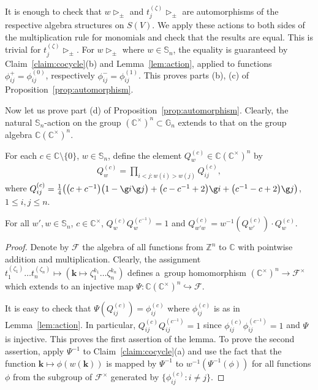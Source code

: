 It is enough to check that $w\mathop{\triangleright}\nolimits_\pm$ and
$t_j^{(\zeta)}\mathop{\triangleright}\nolimits_\pm$ are automorphisms of the respective algebra structures on $S(V)$.
We apply these actions to both sides of the multiplication rule for monomials and check that the results are equal.
This is trivial for $t_j^{(\zeta)}\mathop{\triangleright}\nolimits_\pm$.
For $w\mathop{\triangleright}\nolimits_\pm$ where $w\in \mathbb S_n$,   the equality is guaranteed by
Claim~\ref{claim:cocycle}(b) and Lemma~\ref{lem:action}, applied to functions $\phi_{ij}^+=\phi_{ij}^{(0)}$,
respectively $\phi_{ij}^-=\phi_{ij}^{(1)}$.
This proves parts (b), (c) of Proposition~\ref{prop:automorphism}.

Now let us prove part (d) of Proposition~\ref{prop:automorphism}.
Clearly, the natural $\mathbb S_n$-action on the group $(\mathbb C^\times)^ n\subset \mathbb G_n$ extends to that on the
group algebra $\mathbb C (\mathbb C^\times)^n$.

For each $c\in \mathbb C\setminus\{0\}$, $w\in \mathbb S_n$, def\/ine the element $Q_w^{(c)}\in \mathbb C (\mathbb C^\times)^n$ by
\begin{gather*}
Q_w^{(c)} = \prod\limits_{i<j:w(i)>w(j)} Q_{ij}^{(c)},
\end{gather*}
where $ Q_{ij}^{(c)} = \frac14 \big(\big(c+c^{-1}\big)\big(1-\g i\g j\big)+ \big(c-c^{-1}+2\big)\g i+\big(c^{-1}-c+2\big)\g j\big)$, $1\le i,j\le n$.
\begin{Lemma}\label{lem:Q}
For all $w',w\in \mathbb S_n$, $c\in\mathbb C^\times$, $Q_w^{(c)}Q_w^{(c^{-1})}=1$ and
$Q_{w'w}^{(c)}=w^{-1}(Q_{w'}^{(c)})\cdot Q_w^{(c)}$.
\end{Lemma}
\begin{proof}
Denote by $\mathcal F$ the algebra of all functions from $\mathbb Z^n$ to $\mathbb C$ with pointwise addition and
multiplication.
Clearly, the assignment $t_1^{(\zeta_1)}\ldots t_n^{(\zeta_n)} \mapsto (\mathbf k\mapsto \zeta_1^{k_1}\ldots
\zeta_n^{k_n})$ def\/ines a~group homomorphism $(\mathbb C^\times)^n\to \mathcal F^\times $ which extends to an injective
map $\Psi\colon \mathbb C(\mathbb C^\times)^n\hookrightarrow \mathcal F$.

It is easy to check that $\Psi(Q_{ij}^{(c)})=\phi_{ij}^{(c)}$ where $\phi_{ij}^{(c)}$ is as in Lemma~\ref{lem:action}.
In particular, $Q_{ij}^{(c)}Q_{ij}^{(c^{-1})}=1$ since $\phi_{ij}^{(c)}\phi_{ij}^{(c^{-1})}=1$ and $\Psi$ is injective.
This proves the f\/irst assertion of the lemma.
To prove the second assertion, apply $\Psi^{-1}$ to Claim~\ref{claim:cocycle}(a) and use the fact that the function
$\mathbf k\mapsto \phi(w(\mathbf k))$ is mapped by $\Psi^{-1}$ to $w^{-1}(\Psi^{-1}(\phi))$ for all functions $\phi$
from the subgroup of $\mathcal F^\times$ generated by $\{\phi_{ij}^{(c)}:i\ne j\}$.
\end{proof}

